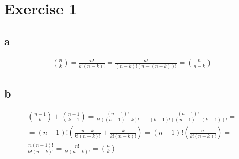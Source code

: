 \documentclass{scrartcl}
\begin{document}
\section*{Exercise 1}
\subsection*{a}
\begin{align*}
  {n \choose k} = \frac{n!}{k!(n-k)!} = \frac{n!}{(n-k)!(n - (n-k))!} = {n \choose n-k}
\end{align*}

\subsection*{b}
\begin{align*}
  {n - 1 \choose k} + {n - 1 \choose k - 1}  = \frac{(n-1)!}{k!((n-1)-k)!} + \frac{(n - 1)!}{(k-1)!((n - 1) - (k-1))!} = \\
  = (n-1)!\left( \frac{n-k}{k!(n-k)!} + \frac{k}{k!(n-k)!} \right) = (n-1)!\left( \frac{n}{k!(n-k)!} \right) = \\
  \frac{n(n-1)!}{k!(n-k)!} = \frac{n!}{k!(n-k)!} = {n \choose k}
\end{align*}
\end{document}
